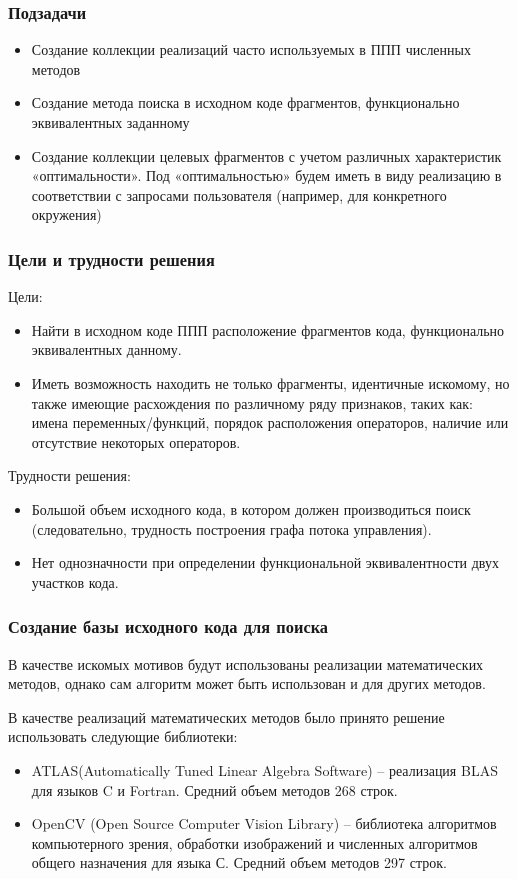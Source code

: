 \documentclass{beamer}
\begin{document}
\begin{frame}
\frametitle{Подзадачи}
\begin{itemize}
	\item Создание коллекции реализаций часто используемых в ППП численных методов
	\item Создание метода поиска в исходном коде фрагментов, функционально
	 эквивалентных заданному
	\item Создание коллекции целевых фрагментов с учетом различных характеристик
	 «оптимальности». Под «оптимальностью» будем иметь в виду реализацию в
	  соответствии с запросами пользователя (например, для конкретного окружения)
\end{itemize}
\end{frame}

\begin{frame}
\frametitle{Цели и трудности решения}
Цели: 
\begin{itemize}
	\item Найти в исходном коде ППП расположение фрагментов кода, функционально
эквивалентных данному.
	\item Иметь возможность находить не только фрагменты, идентичные искомому, но
также имеющие расхождения по различному ряду признаков, таких как: имена
переменных/функций, порядок расположения операторов, наличие или
отсутствие некоторых операторов.
\end{itemize}

Трудности решения: 
\begin{itemize}
	\item Большой объем исходного кода, в котором должен производиться поиск
(следовательно, трудность построения графа потока управления).
	\item Нет однозначности при определении функциональной эквивалентности двух
участков кода.
\end{itemize}
\end{frame}

\begin{frame}
\frametitle{Создание базы исходного кода для поиска}
В качестве искомых мотивов будут использованы реализации математических методов,
 однако сам алгоритм может быть использован и для других методов. 

В качестве реализаций математических методов было принято решение использовать
 следующие библиотеки: 
\begin{itemize}
	\item ATLAS(Automatically Tuned Linear Algebra Software) -- реализация BLAS для
	 языков C и Fortran. Средний объем методов 268 строк.
	\item OpenCV (Open Source Computer Vision Library) -- библиотека алгоритмов
	 компьютерного зрения, обработки изображений и численных алгоритмов общего
	  назначения  для языка С. Средний объем методов 297 строк.
\end{itemize}
\end{frame}
\end{document}
